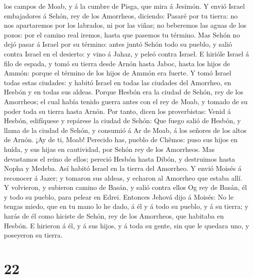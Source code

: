 los campos de Moab, y á la cumbre de Pisga, que mira á Jesimón.
 Y envió Israel embajadores á Sehón, rey de los Amorrheos,
diciendo:  Pasaré por tu tierra: no nos apartaremos por los
labrados, ni por las viñas; no beberemos las aguas de los pozos: por el
camino real iremos, hasta que pasemos tu término.  Mas
Sehón no dejó pasar á Israel por su término: antes juntó Sehón todo su
pueblo, y salió contra Israel en el desierto: y vino á Jahaz, y peleó
contra Israel.  E hirióle Israel á filo de espada, y tomó
su tierra desde Arnón hasta Jaboc, hasta los hijos de Ammón: porque el
término de los hijos de Ammón era fuerte.  Y tomó Israel
todas estas ciudades: y habitó Israel en todas las ciudades del
Amorrheo, en Hesbón y en todas sus aldeas.  Porque Hesbón
era la ciudad de Sehón, rey de los Amorrheos; el cual había tenido
guerra antes con el rey de Moab, y tomado de su poder toda su tierra
hasta Arnón.  Por tanto, dicen los proverbistas: Venid á
Hesbón, edifíquese y repárese la ciudad de Sehón:  Que
fuego salió de Hesbón, y llama de la ciudad de Sehón, y consumió á Ar de
Moab, á los señores de los altos de Arnón.  ¡Ay de ti,
Moab! Perecido has, pueblo de Chêmos: puso sus hijos en huída, y sus
hijas en cautividad, por Sehón rey de los Amorrheos.  Mas
devastamos el reino de ellos; pereció Hesbón hasta Dibón, y destruimos
hasta Nopha y Medeba.  Así habitó Israel en la tierra del
Amorrheo.  Y envió Moisés á reconocer á Jazer; y tomaron
sus aldeas, y echaron al Amorrheo que estaba allí.  Y
volvieron, y subieron camino de Basán, y salió contra ellos Og rey de
Basán, él y todo su pueblo, para pelear en Edrei.  Entonces
Jehová dijo á Moisés: No le tengas miedo, que en tu mano lo he dado, á
él y á todo su pueblo, y á su tierra; y harás de él como hiciste de
Sehón, rey de los Amorrheos, que habitaba en Hesbón.  E
hirieron á él, y á sus hijos, y á toda su gente, sin que le quedara uno,
y poseyeron su tierra.

\hypertarget{section-21}{%
\section{22}\label{section-21}}

